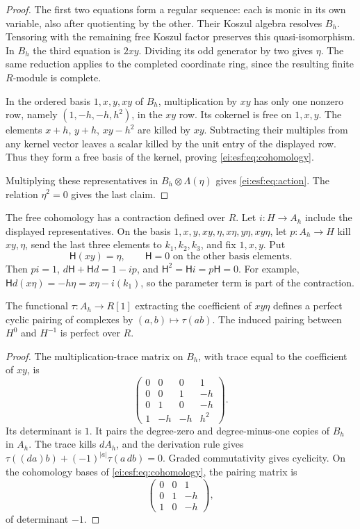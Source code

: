 \begin{proof}
The first two equations form a regular sequence: each is
monic in its own variable, also after quotienting by the
other. Their Koszul algebra resolves $B_h$. Tensoring with
the remaining free Koszul factor preserves this
quasi-isomorphism. In $B_h$ the third equation is $2xy$.
Dividing its odd generator by two gives $\eta$.
The same reduction applies to the completed coordinate
ring, since the resulting finite $R$-module is complete.

In the ordered basis $1,x,y,xy$ of $B_h$, multiplication by
$xy$ has only one nonzero row, namely
$(1,-h,-h,h^2)$, in the $xy$ row. Its cokernel is free on
$1,x,y$. The elements $x+h$, $y+h$, $xy-h^2$ are killed by
$xy$. Subtracting their multiples from any kernel vector
leaves a scalar killed by the unit entry of the displayed
row. Thus they form a free basis of the kernel, proving
\eqref{ei:esf:eq:cohomology}.

Multiplying these representatives in $B_h\otimes\Lambda(\eta)$
gives \eqref{ei:esf:eq:action}. The relation $\eta^2=0$ gives
the last claim.
\end{proof}

The free cohomology has a contraction defined over $R$.
Let $i:H\to A_h$ include the displayed representatives.
On the basis $1,x,y,xy,\eta,x\eta,y\eta,xy\eta$, let
$p:A_h\to H$ kill $xy,\eta$, send the last three elements
to $k_1,k_2,k_3$, and fix $1,x,y$. Put
\begin{equation}\label{ei:esf:eq:contraction}
 \mathsf H(xy)=\eta,\qquad
 \mathsf H=0\text{ on the other basis elements}.
\end{equation}
Then $pi=1$, $d\mathsf H+\mathsf Hd=1-ip$, and
$\mathsf H^2=\mathsf Hi=p\mathsf H=0$.
For example,
$\mathsf Hd(x\eta)=-h\eta=x\eta-i(k_1)$,
so the parameter term is part of the contraction.

\begin{proposition}\label{ei:esf:prop:trace}
The functional $\tau:A_h\to R[1]$ extracting the coefficient
of $xy\eta$ defines a perfect cyclic pairing of complexes
by $(a,b)\mapsto\tau(ab)$. The induced pairing between
$H^0$ and $H^{-1}$ is perfect over $R$.
\end{proposition}

\begin{proof}
The multiplication-trace matrix on $B_h$, with trace equal
to the coefficient of $xy$, is
\[
 \begin{pmatrix}
 0&0&0&1\\0&0&1&-h\\0&1&0&-h\\1&-h&-h&h^2
 \end{pmatrix}.
\]
Its determinant is $1$. It pairs the degree-zero and
degree-minus-one copies of $B_h$ in $A_h$.
The trace kills $dA_h$, and the derivation rule gives
$\tau((da)b)+(-1)^{|a|}\tau(a\,db)=0$.
Graded commutativity gives cyclicity. On the cohomology
bases of \eqref{ei:esf:eq:cohomology}, the pairing matrix is
\[
 \begin{pmatrix}0&0&1\\0&1&-h\\1&0&-h\end{pmatrix},
\]
of determinant $-1$.
\end{proof}

